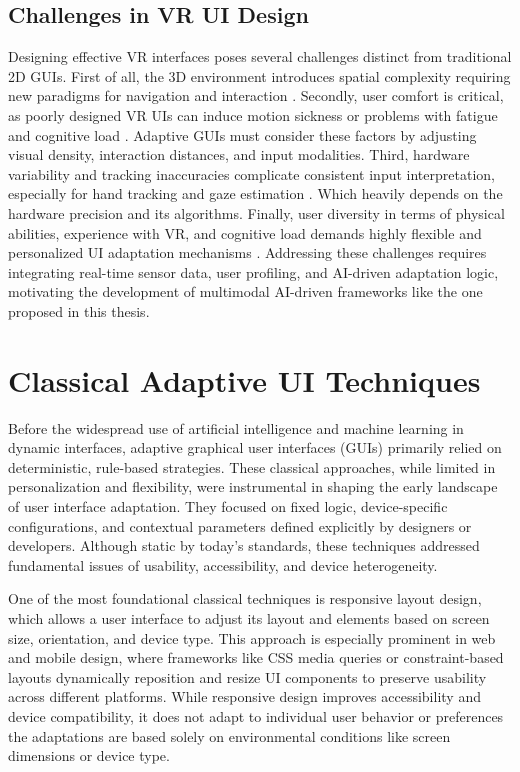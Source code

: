 \documentclass[openany]{book}
\begin{document}
\subsection{Challenges in VR UI Design}
Designing effective VR interfaces poses several challenges distinct from traditional 2D GUIs. First of all, the 3D environment introduces spatial complexity requiring new paradigms for navigation and interaction \cite{Bowman20023DUI}.  
Secondly, user comfort is critical, as poorly designed VR UIs can induce motion sickness or problems with fatigue and cognitive load \cite{LaViola2000VRSimulatorSickness}. Adaptive GUIs must consider these factors by adjusting visual density, interaction distances, and input modalities.  
Third, hardware variability and tracking inaccuracies complicate consistent input interpretation, especially for hand tracking and gaze estimation \cite{Jerald2015VRBook}. Which heavily depends on the hardware precision and its algorithms. 
Finally, user diversity in terms of physical abilities, experience with VR, and cognitive load demands highly flexible and personalized UI adaptation mechanisms \cite{Vasiljevic2017AdaptiveVRAccessibility}.  
Addressing these challenges requires integrating real-time sensor data, user profiling, and AI-driven adaptation logic, motivating the development of multimodal AI-driven frameworks like the one proposed in this thesis.

\section{Classical Adaptive UI Techniques}
Before the widespread use of artificial intelligence and machine learning in dynamic interfaces, adaptive graphical user interfaces (GUIs) primarily relied on deterministic, rule-based strategies. These classical approaches, while limited in personalization and flexibility, were instrumental in shaping the early landscape of user interface adaptation. They focused on fixed logic, device-specific configurations, and contextual parameters defined explicitly by designers or developers. Although static by today’s standards, these techniques addressed fundamental issues of usability, accessibility, and device heterogeneity.

One of the most foundational classical techniques is responsive layout design, which allows a user interface to adjust its layout and elements based on screen size, orientation, and device type. This approach is especially prominent in web and mobile design, where frameworks like CSS media queries or constraint-based layouts dynamically reposition and resize UI components to preserve usability across different platforms. While responsive design improves accessibility and device compatibility, it does not adapt to individual user behavior or preferences the adaptations are based solely on environmental conditions like screen dimensions or device type.
\end{document}
